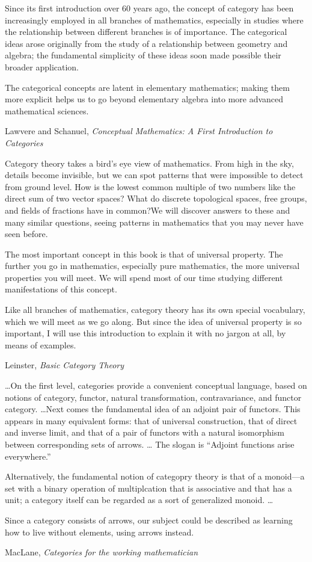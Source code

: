 \documentclass[11pt,openany]{article}
\begin{document}
\epigraph{Since its first introduction over 60 years ago, the concept of category has been
increasingly employed in all branches of mathematics, especially in studies where the
relationship between different branches is of importance. The categorical ideas arose
originally from the study of a relationship between geometry and algebra; the
fundamental simplicity of these ideas soon made possible their broader application.
\par
The categorical concepts are latent in elementary mathematics; making them more
explicit helps us to go beyond elementary algebra into more advanced mathematical
sciences.}
{Lawvere and Schanuel, 
\textit{Conceptual Mathematics: 
A First Introduction to Categories}~\cite{lawvere-schanuel-2009}}

\pagebreak
\epigraph{Category theory takes a bird’s eye view of mathematics. From high in the sky,
details become invisible, but we can spot patterns that were impossible to detect
from ground level. How is the lowest common multiple of two numbers
like the direct sum of two vector spaces? What do discrete topological spaces,
free groups, and fields of fractions have in common?We will discover answers
to these and many similar questions, seeing patterns in mathematics that you
may never have seen before.
\par
The most important concept in this book is that of universal property. The
further you go in mathematics, especially pure mathematics, the more universal
properties you will meet. We will spend most of our time studying different
manifestations of this concept.
\par
Like all branches of mathematics, category theory has its own special vocabulary,
which we will meet as we go along. But since the idea of universal
property is so important, I will use this introduction to explain it with no jargon
at all, by means of examples.}
{Leinster, \textit{Basic Category Theory}~\cite{leinster-2016-basic-category-theory}}

\epigraph{\ldots On the first level, categories provide
a convenient conceptual language, based on notions of category, 
functor, natural transformation, contravariance, and
functor category.
\ldots Next comes the fundamental idea of an adjoint pair of functors.
This appears in many equivalent forms: that of universal construction,
that of direct and inverse limit, 
and that of a pair of functors with a natural isomorphism between
corresponding sets of arrows. \ldots
The slogan is ``Adjoint functions arise everywhere.''
\par
Alternatively, the fundamental notion of categopry theory is that
of a monoid---a set with a binary operation of multiplcation
that is associative and that has a unit;
a category itself can be regarded as a sort of generalized monoid.
\ldots
\par
Since a category consists of arrows, our subject could be 
described as learning how to live without elements, using arrows
instead.
}
{MacLane, \textit{Categories for the working
mathematician}~\cite{maclane-1998-working-mathematician}}
\end{document}

